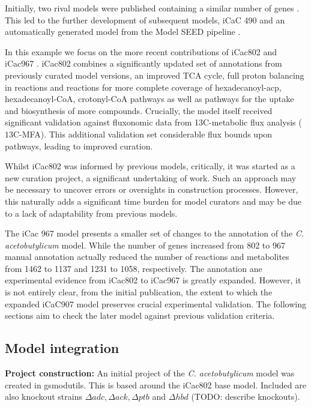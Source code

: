 \documentclass[a4paper,10pt]{article}
\begin{document}
Initially, two rival models were published containing a similar number of genes \cite{lee2008genome, senger2008genome}.
This led to the further development of subsequent models, iCaC 490 \cite{mcanulty2012genome} and an automatically generated model from  the Model SEED  pipeline \cite{}.

In this example we focus on the more recent contributions of iCac802 \cite{dash2014capturing} and iCac967 \cite{yoo2015quantitative}.
iCac802 combines a significantly updated set of annotations from previously curated model versions, an improved TCA cycle, full proton balancing in reactions and reactions for more complete coverage of hexadecanoyl-acp, hexadecanoyl-CoA, crotonyl-CoA pathways as well as pathways for the uptake and biosynthesis of more compounds.
Crucially, the model itself received significant validation against fluxonomic data from 13C-metabolic flux analysis ($13$C-MFA).
This additional validation set considerable flux bounds upon pathways, leading to improved curation.

Whilst iCac802 was informed by previous models, critically, it was started as a new curation project, a significant undertaking of work.
Such an approach may be necessary to uncover errors or oversights in construction processes.
However, this naturally adds a significant time burden for model curators and may be due to a lack of adaptability from previous models.

The iCac 967 model presents a smaller set of changes to the annotation of the \textit{C. acetobutylicum} model.
While the number of genes increased from 802 to 967 manual annotation actually reduced the number of reactions and metabolites from 1462 to 1137 and 1231 to 1058, respectively.
The annotation ane experimental evidence from iCac802 \cite{dash2014capturing} to iCac967 \cite{yoo2015quantitative} is greatly expanded.
However, it is not entirely clear, from the initial publication, the extent to which the expanded iCaC907 model preserves crucial experimental validation.
The following sections aim to check the later model against previous validation criteria.

\subsection{Model integration}
\textbf{Project construction:}
An initial project of the \textit{C. acetobutylicum} model was created in gsmodutils.
This is based around the iCac802 base model.
Included are also knockout strains $\Delta adc, \Delta ack, \Delta ptb$ and $\Delta hbd$ (TODO: describe knockouts).
\end{document}
